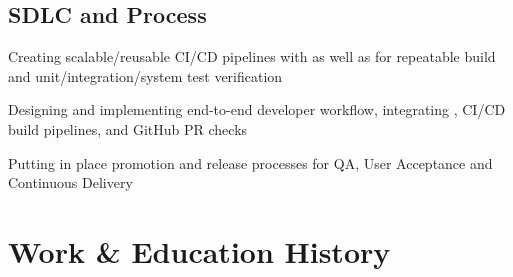 \documentclass[11.5pt]{article}
\begin{document}
\begin{multicols}{2}
\subsection*{SDLC and Process}
\vspace{0.25in}
\begin{itemize*}
  \setlength\itemsep{0.4em}
  \item Creating scalable/reusable CI/CD pipelines with  as well as  for repeatable build and unit/integration/system test verification
  \item Designing and implementing end-to-end developer workflow, integrating , CI/CD build pipelines, and GitHub PR checks
  \item Putting in place promotion and release processes for QA, User Acceptance and Continuous Delivery
\end{itemize*}

\end{multicols}

\section*{Work \& Education History}
\end{document}
